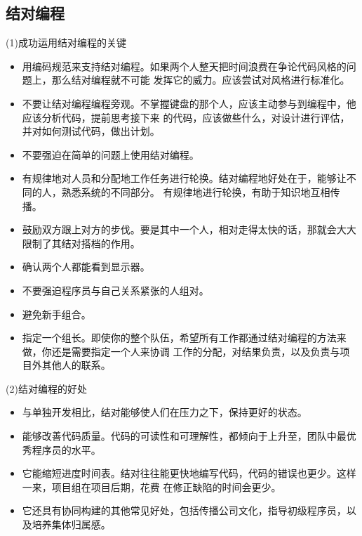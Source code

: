 \documentclass{article}
\begin{document}
\subsection{结对编程}
\par
(1)成功运用结对编程的关键
\par
\begin{itemize}
    \item 用编码规范来支持结对编程。如果两个人整天把时间浪费在争论代码风格的问题上，那么结对编程就不可能
    发挥它的威力。应该尝试对风格进行标准化。
    \item 不要让结对编程编程旁观。不掌握键盘的那个人，应该主动参与到编程中，他应该分析代码，提前思考接下来
    的代码，应该做些什么，对设计进行评估，并对如何测试代码，做出计划。
    \item 不要强迫在简单的问题上使用结对编程。
    \item 有规律地对人员和分配地工作任务进行轮换。结对编程地好处在于，能够让不同的人，熟悉系统的不同部分。
    有规律地进行轮换，有助于知识地互相传播。
    \item 鼓励双方跟上对方的步伐。要是其中一个人，相对走得太快的话，那就会大大限制了其结对搭档的作用。
    \item 确认两个人都能看到显示器。
    \item 不要强迫程序员与自己关系紧张的人组对。
    \item 避免新手组合。
    \item 指定一个组长。即使你的整个队伍，希望所有工作都通过结对编程的方法来做，你还是需要指定一个人来协调
    工作的分配，对结果负责，以及负责与项目外其他人的联系。
\end{itemize}

\par
(2)结对编程的好处
\par
\begin{itemize}
    \item 与单独开发相比，结对能够使人们在压力之下，保持更好的状态。
    \item 能够改善代码质量。代码的可读性和可理解性，都倾向于上升至，团队中最优秀程序员的水平。
    \item 它能缩短进度时间表。结对往往能更快地编写代码，代码的错误也更少。这样一来，项目组在项目后期，花费
    在修正缺陷的时间会更少。
    \item 它还具有协同构建的其他常见好处，包括传播公司文化，指导初级程序员，以及培养集体归属感。
\end{itemize}
\end{document}
